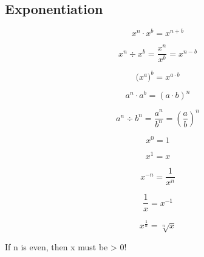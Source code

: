 \vspace{0.5cm}\subsection{Exponentiation}
\vspace{0.5cm}\begin{definition}\label{def-exponentiation}
    
    \begin{equation}
        x^n \cdot x^b = x^{n+b} \label{eq-48}
    \end{equation}

    \begin{equation}
        x^n \div x^b = \frac{x^n}{x^b} = x^{n-b} \label{eq-49}
    \end{equation}

    \begin{equation}
       \Big(x^a\Big)^b = x^{a \cdot b} \label{eq-50}
    \end{equation}

    \begin{equation}
        a^n \cdot a^b = (a \cdot b)^n \label{eq-51}
    \end{equation}

    \begin{equation}
        a^n \div b^n = \frac{a^n}{b^n} = \left(\frac{a}{b}\right)^n \label{eq-52}
    \end{equation}

    \begin{equation}
        x^0 = 1 \label{eq-53}
    \end{equation}

    \begin{equation}
        x^1 = x \label{eq-54}
    \end{equation}

    \begin{equation}
        x^{-n} = \frac{1}{x^n} \label{eq-55}
    \end{equation}

    \begin{equation}
        \frac{1}{x} = x^{-1} \label{eq-56}
    \end{equation}

    \begin{equation}
        x^{\frac{1}{n}} = \sqrt[n]{x} \label{eq-57}
    \end{equation}

    \flushleft {} If n is even, then x must be > 0!


\end{definition}
